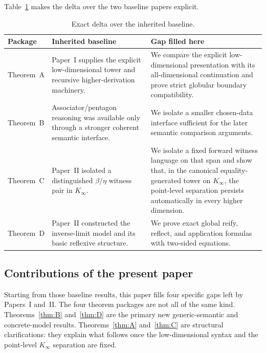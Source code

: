 \documentclass[webpdf,traditional,large,numbered]{oup-authoring-template}
\theoremstyle{thmstyleone}%
\theoremstyle{thmstyletwo}%
\theoremstyle{thmstylethree}%
\newcommand{\Kinf}{K_\infty}
\begin{document}
\medskip
\noindent
Table~\ref{tab:paper-delta} makes the delta over the two baseline papers
explicit.

\begin{table}[htbp]
\centering
\small
\begin{tabular}{p{}p{}p{}}
\textbf{Package} & \textbf{Inherited baseline} & \textbf{Gap filled here} \\
\hline
Theorem~A &
Paper~I supplies the explicit low-dimensional tower and recursive
higher-derivation machinery. &
We compare the explicit low-dimensional presentation with its
all-dimensional continuation and prove strict globular boundary compatibility. \\
Theorem~B &
Associator/pentagon reasoning was available only through a stronger coherent
semantic interface. &
We isolate a smaller chosen-data interface sufficient for the later semantic
comparison arguments. \\
Theorem~C &
Paper~II isolated a distinguished $\beta/\eta$ witness pair in $\Kinf$. &
We isolate a fixed forward witness language on that span and show that, in the
canonical equality-generated tower on $\Kinf$, the point-level separation
persists automatically in every higher dimension. \\
Theorem~D &
Paper~II constructed the inverse-limit model and its basic reflexive structure. &
We prove exact global reify, reflect, and application formulas with two-sided
equations. \\
\end{tabular}
\caption{Exact delta over the inherited baseline.}
\label{tab:paper-delta}
\end{table}

\subsection{Contributions of the present paper}

Starting from those baseline results, this paper fills four
specific gaps left by Papers~I and~II.  The four theorem packages are not all
of the same kind.  Theorems~\ref{thm:B} and~\ref{thm:D} are the primary new
generic-semantic and concrete-model results.  Theorems~\ref{thm:A}
and~\ref{thm:C} are structural clarifications: they explain what follows once
the low-dimensional syntax and the point-level $\Kinf$ separation are fixed.
\end{document}
